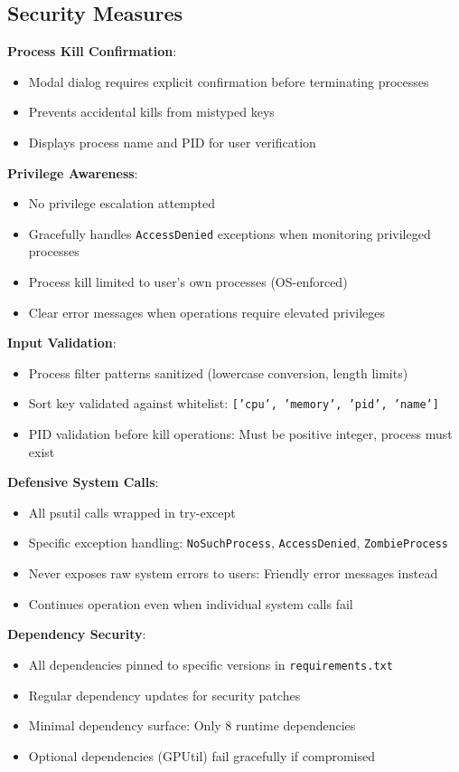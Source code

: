 \documentclass[12pt,a4paper,oneside]{report}
\begin{document}
\subsection{Security Measures}

\textbf{Process Kill Confirmation}:
\begin{itemize}
    \item Modal dialog requires explicit confirmation before terminating processes
    \item Prevents accidental kills from mistyped keys
    \item Displays process name and PID for user verification
\end{itemize}

\textbf{Privilege Awareness}:
\begin{itemize}
    \item No privilege escalation attempted
    \item Gracefully handles \texttt{AccessDenied} exceptions when monitoring privileged processes
    \item Process kill limited to user's own processes (OS-enforced)
    \item Clear error messages when operations require elevated privileges
\end{itemize}

\textbf{Input Validation}:
\begin{itemize}
    \item Process filter patterns sanitized (lowercase conversion, length limits)
    \item Sort key validated against whitelist: \texttt{['cpu', 'memory', 'pid', 'name']}
    \item PID validation before kill operations: Must be positive integer, process must exist
\end{itemize}

\textbf{Defensive System Calls}:
\begin{itemize}
    \item All psutil calls wrapped in try-except
    \item Specific exception handling: \texttt{NoSuchProcess}, \texttt{AccessDenied}, \texttt{ZombieProcess}
    \item Never exposes raw system errors to users: Friendly error messages instead
    \item Continues operation even when individual system calls fail
\end{itemize}

\textbf{Dependency Security}:
\begin{itemize}
    \item All dependencies pinned to specific versions in \texttt{requirements.txt}
    \item Regular dependency updates for security patches
    \item Minimal dependency surface: Only 8 runtime dependencies
    \item Optional dependencies (GPUtil) fail gracefully if compromised
\end{itemize}
\end{document}
